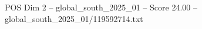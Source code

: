 \begin{textsample}{POS Dim 2 – global\_south\_2025\_01 – Score 24.00 – global\_south\_2025\_01/119592714.txt}
\end{textsample}
